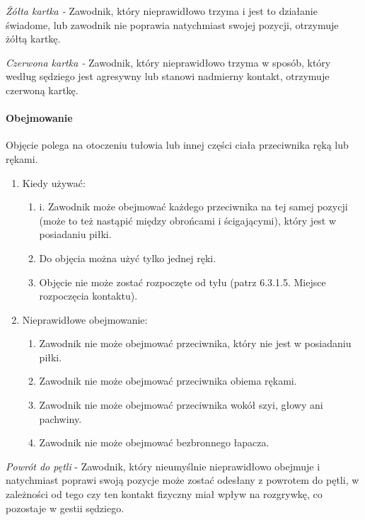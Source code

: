 \documentclass[12pt]{article}
\begin{document}
\emph{Żółta kartka -} Zawodnik, który nieprawidłowo trzyma i jest to
działanie świadome, lub zawodnik nie poprawia natychmiast swojej
pozycji, otrzymuje żółtą kartkę.

\emph{Czerwona kartka -} Zawodnik, który nieprawidłowo trzyma w sposób,
który według sędziego jest agresywny lub stanowi nadmierny kontakt,
otrzymuje czerwoną kartkę.

\paragraph{Obejmowanie}
Objęcie polega na otoczeniu tułowia lub
innej części ciała przeciwnika ręką lub rękami.

\begin{enumerate}
\item
    Kiedy używać:
  
  \begin{enumerate}
  \item
        i. Zawodnik może obejmować każdego przeciwnika na tej samej pozycji
    (może to też nastąpić między obrońcami i ścigającymi), który jest w
    posiadaniu piłki.
      \item
        Do objęcia można użyć tylko jednej ręki.
      \item
        Objęcie nie może zostać rozpoczęte od tyłu (patrz 6.3.1.5. Miejsce
    rozpoczęcia kontaktu).
      \end{enumerate}
\item
    Nieprawidłowe obejmowanie:
  
  \begin{enumerate}
  \item Zawodnik nie może obejmować przeciwnika, który nie jest w posiadaniu
    piłki.
      \item
        Zawodnik nie może obejmować przeciwnika obiema rękami.
      \item
        Zawodnik nie może obejmować przeciwnika wokół szyi, głowy ani
    pachwiny.
      \item
        Zawodnik nie może obejmować bezbronnego łapacza.
      \end{enumerate}
\end{enumerate}

\emph{Powrót do pętli} - Zawodnik, który nieumyślnie nieprawidłowo
obejmuje i natychmiast poprawi swoją pozycje może zostać odesłany z
powrotem do pętli, w zależności od tego czy ten kontakt fizyczny miał
wpływ na rozgrywkę, co pozostaje w gestii sędziego.
\end{document}
